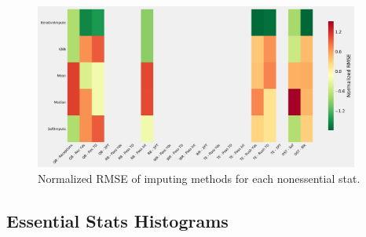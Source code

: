 \documentclass[12pt]{article}
\begin{document}
\begin{figure}[H]
  \centering
  \includegraphics[width=0.95\textwidth]{../figures/nonessential_impute_RMSE}
  \caption{Normalized RMSE of imputing methods for each nonessential stat.}
\end{figure}

\pagebreak
\subsection{Essential Stats Histograms}
\end{document}
